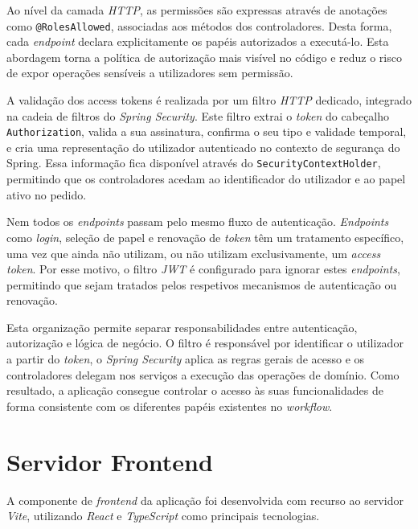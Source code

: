 Ao n\'{i}vel da camada \textit{HTTP}, as permiss\~{o}es s\~{a}o expressas atrav\'{e}s de anota\c{c}\~{o}es como \texttt{@RolesAllowed}, associadas aos m\'{e}todos dos controladores. Desta forma, cada \textit{endpoint} declara explicitamente os pap\'{e}is autorizados a execut\'{a}-lo. Esta abordagem torna a pol\'{i}tica de autoriza\c{c}\~{a}o mais vis\'{i}vel no c\'{o}digo e reduz o risco de expor opera\c{c}\~{o}es sens\'{i}veis a utilizadores sem permiss\~{a}o.

A valida\c{c}\~{a}o dos access tokens \'{e} realizada por um filtro \textit{HTTP} dedicado, integrado na cadeia de filtros do \textit{Spring Security}. Este filtro extrai o \textit{token} do cabe\c{c}alho \texttt{Authorization}, valida a sua assinatura, confirma o seu tipo e validade temporal, e cria uma representa\c{c}\~{a}o do utilizador autenticado no contexto de seguran\c{c}a do Spring. Essa informa\c{c}\~{a}o fica dispon\'{i}vel atrav\'{e}s do \texttt{SecurityContextHolder}, permitindo que os controladores acedam ao identificador do utilizador e ao papel ativo no pedido.

Nem todos os \textit{endpoints} passam pelo mesmo fluxo de autentica\c{c}\~{a}o. \textit{Endpoints} como \textit{login}, sele\c{c}\~{a}o de papel e renova\c{c}\~{a}o de \textit{token} t\^{e}m um tratamento espec\'{i}fico, uma vez que ainda n\~{a}o utilizam, ou n\~{a}o utilizam exclusivamente, um \textit{access token}. Por esse motivo, o filtro \textit{JWT} \'{e} configurado para ignorar estes \textit{endpoints}, permitindo que sejam tratados pelos respetivos mecanismos de autentica\c{c}\~{a}o ou renova\c{c}\~{a}o.

Esta organiza\c{c}\~{a}o permite separar responsabilidades entre autentica\c{c}\~{a}o, autoriza\c{c}\~{a}o e l\'{o}gica de neg\'{o}cio. O filtro \'{e} respons\'{a}vel por identificar o utilizador a partir do \textit{token}, o \textit{Spring Security} aplica as regras gerais de acesso e os controladores delegam nos servi\c{c}os a execu\c{c}\~{a}o das opera\c{c}\~{o}es de dom\'{i}nio. Como resultado, a aplica\c{c}\~{a}o consegue controlar o acesso \`{a}s suas funcionalidades de forma consistente com os diferentes pap\'{e}is existentes no \textit{workflow}.


\section{Servidor Frontend} \label{sec:frontend-server}

A componente de \textit{frontend} da aplicação foi desenvolvida com recurso ao servidor \textit{Vite}, utilizando \textit{React} e \textit{TypeScript} como principais tecnologias.

